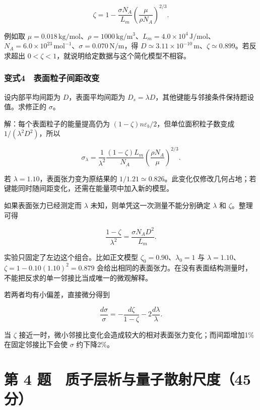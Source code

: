 \documentclass[12pt,a4paper,fontset=fandol]{ctexart}
\begin{document}
\[\boxed{\zeta=1-\frac{\sigma N_A}{L_m}
\left(\frac\mu{\rho N_A}\right)^{2/3}.}\]

例如取
\(\mu=0.018\,\mathrm{kg/mol}\)、\(\rho=1000\,\mathrm{kg/m^3}\)、\(L_m=4.0\times10^4\,\mathrm{J/mol}\)、\(N_A=6.0\times10^{23}\,\mathrm{mol^{-1}}\)、\(\sigma=0.070\,\mathrm{N/m}\)，得
\(D\simeq3.11\times10^{-10}\,\mathrm m\)、\(\zeta\simeq0.899\)。若反求超出
\(0<\zeta<1\)，就说明给定数据与这个简化模型不相容。

\noindent\begin{minipage}{\linewidth}
\subsubsection{变式4　表面粒子间距改变}\label{ux53d8ux5f0f4-ux8868ux9762ux7c92ux5b50ux95f4ux8dddux6539ux53d8}

设内部平均间距为 \(D\)，表面平均间距为
\(D_s=\lambda D\)，其他键能与邻接条件保持题设值。求修正的 \(\sigma\)。

解：每个表面粒子的能量提高仍为
\((1-\zeta)n\varepsilon_b/2\)，但单位面积粒子数变成
\(1/(\lambda^2D^2)\)，所以

\[\boxed{\sigma_\lambda=\frac1{\lambda^2}
\frac{(1-\zeta)L_m}{N_A}
\left(\frac{\rho N_A}{\mu}\right)^{2/3}.}\]

若 \(\lambda=1.10\)，表面张力变为原结果的
\(1/1.21\simeq0.826\)。此变化仅修改几何占地；若键能同时随间距变化，还需在能量项中加入新的模型。

如果表面张力已经测定而 \(\lambda\) 未知，则单凭这一次测量不能分别确定
\(\lambda\) 和 \(\zeta\)。整理可得

\[\frac{1-\zeta}{\lambda^2}
=\frac{\sigma N_AD^2}{L_m}.\]

实验只固定了左边这个组合。比如正文模型 \(\zeta_0=0.90\)、\(\lambda_0=1\)
与 \(\lambda=1.10\)、\(\zeta=1-0.10(1.10)^2=0.879\)
会给出相同的表面张力。在没有表面结构测量时，不能把反求的单一邻接比当成唯一的微观解释。

若两者均有小偏差，直接微分得到

\[\frac{d\sigma}{\sigma}
=-\frac{d\zeta}{1-\zeta}-2\frac{d\lambda}{\lambda}.\]

当 \(\zeta\)
接近一时，微小邻接比变化会造成较大的相对表面张力变化；而间距增加1\%在固定邻接比下会使
\(\sigma\) 约下降2\%。


\end{minipage}

\clearpage

\section{第 4
题　质子层析与量子散射尺度（45分）}\label{ux7b2c-4-ux9898-ux8d28ux5b50ux5c42ux6790ux4e0eux91cfux5b50ux6563ux5c04ux5c3aux5ea645ux5206}
\end{document}
